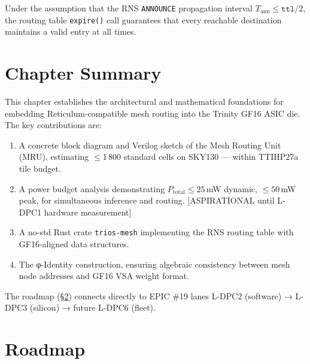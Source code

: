 \begin{theorem}
\label{thm:mru-liveness}
Under the assumption that the RNS \texttt{ANNOUNCE} propagation interval
$T_{\text{ann}} \leq \texttt{ttl} / 2$, the routing table
\texttt{expire()} call guarantees that every reachable destination
maintains a valid entry at all times.
\end{theorem}

\section{Chapter Summary}

This chapter establishes the architectural and mathematical foundations
for embedding Reticulum-compatible mesh routing into the Trinity GF16
ASIC die.
The key contributions are:
\begin{enumerate}
  \item A concrete block diagram and Verilog sketch of the
        Mesh Routing Unit (MRU), estimating $\leq$1\,800 standard cells
        on SKY130 — within TTIHP27a tile budget.
  \item A power budget analysis demonstrating
        $P_{\text{total}} \leq 25$\,mW dynamic, $\leq 50$\,mW peak,
        for simultaneous inference and routing. [ASPIRATIONAL until
        L-DPC1 hardware measurement]
  \item A no-std Rust crate \texttt{trios-mesh} implementing
        the RNS routing table with GF16-aligned data structures.
  \item The φ-Identity construction, ensuring algebraic consistency
        between mesh node addresses and GF16 VSA weight format.
\end{enumerate}

The roadmap (§\ref{sec:mesh-roadmap}) connects directly to EPIC \#19
lanes L-DPC2 (software) → L-DPC3 (silicon) → future L-DPC6 (fleet).

\section{Roadmap}
\label{sec:mesh-roadmap}

\begin{table}[h]
\centering
\caption{Ch.35 deliverables and EPIC \#19 gate mapping}
\end{table}

